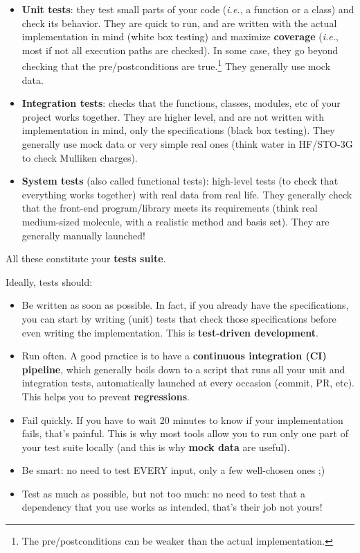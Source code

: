 \documentclass[10pt,
aspectratio=169
]{beamer}
\begin{document}
\begin{frame}
	\begin{itemize}
		\item \textbf{Unit tests}: they test small parts of your code (\textit{i.e.}, a function or a class) and check its behavior. They are quick to run, and are written with the actual implementation in mind (white box testing) and maximize \textbf{coverage} (\textit{i.e.}, most if not all execution paths are checked). In some case, they go beyond checking that the pre/postconditions are true.\footnote{The pre/postconditions can be weaker than the actual implementation.} They generally use mock data.
		\item \textbf{Integration tests}: checks that the functions, classes, modules, etc of your project works together. They are higher level, and are not written with implementation in mind, only the specifications (black box testing). They generally use mock data or very simple real ones (think water in HF/STO-3G to check Mulliken charges).
		\item \textbf{System tests} (also called functional tests): high-level tests (to check that everything works together) with real data from real life. They generally check that the front-end program/library meets its requirements (think real medium-sized molecule, with a realistic method and basis set). They are generally manually launched!
	\end{itemize}
	All these constitute your \textbf{tests suite}.
\end{frame}

\begin{frame}
	Ideally, tests should: \begin{itemize}
		\item Be written as soon as possible. In fact, if you already have the specifications, you can start by writing (unit) tests that check those specifications before even writing the implementation. This is \textbf{test-driven development}. 
		\item Run often. A good practice is to have a \textbf{continuous integration (CI) pipeline}, which generally boils down to a script that runs all your unit and integration tests, automatically launched at every occasion (commit, PR, etc). This helps you to prevent \textbf{regressions}.
		\item Fail quickly. If you have to wait 20 minutes to know if your implementation fails, that's painful. This is why most tools allow you to run only one part of your test suite locally (and this is why \textbf{mock data} are useful).
		\item Be smart: no need to test EVERY input, only a few well-chosen ones ;)
		\item Test as much as possible, but not too much: no need to test that a dependency that you use works as intended, that's their job not yours!
	\end{itemize}
\end{frame}
\end{document}
